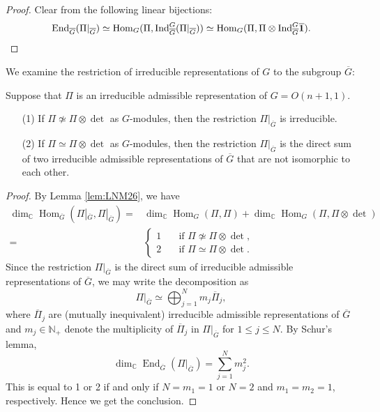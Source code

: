 \begin{proof}
Clear from the following linear bijections:
\[
{\operatorname{End}}_{\overline G}(\Pi|_{\overline{G}})
\simeq 
{\operatorname{Hom}}_{G}(\Pi, {\operatorname{Ind}}_{\overline G}^{G}(\Pi|_{\overline{G}}))
\simeq 
{\operatorname{Hom}}_{G}(\Pi, \Pi \otimes {\operatorname{Ind}}_{\overline G}^{G}\overline{\bf{1}}).  
\]
\end{proof}

We examine the restriction
 of irreducible representations of $G$
 to the subgroup $\overline G$:

\begin{lemma}
\label{lem:171523}
Suppose that $\Pi$ is an irreducible admissible representation of $G=O(n+1,1)$.  
\begin{enumerate}
\item[{\rm{(1)}}]
If $\Pi \not \simeq \Pi \otimes \det$ as $G$-modules, 
 then the restriction $\Pi|_{\overline G}$ is irreducible.  
\item[{\rm{(2)}}]
If $\Pi \simeq \Pi \otimes \det$ as $G$-modules, 
then the restriction $\Pi|_{\overline G}$ is the direct sum 
of two irreducible admissible representations
of $\overline G$ that are not isomorphic to each other.  
\end{enumerate}
\end{lemma}
\begin{proof}
By Lemma \ref{lem:LNM26}, 
 we have 
\begin{align*}
\dim_{\mathbb{C}}{\operatorname{Hom}}_{\overline G}(\Pi|_{\overline G}, \Pi|_{\overline G})
=& \dim_{\mathbb{C}} {\operatorname{Hom}}_{G}(\Pi, \Pi) 
+ \dim_{\mathbb{C}}{\operatorname{Hom}}_{G}(\Pi, \Pi \otimes \det)
\\
=& 
\begin{cases}
1 \quad &\text{if $\Pi \not \simeq \Pi \otimes \det$, }
\\
2 \quad &\text{if $\Pi \simeq \Pi \otimes \det$.  }
\end{cases}
\end{align*}
Since the restriction $\Pi|_{\overline G}$ is the direct sum
 of irreducible admissible representations 
 of ${\overline G}$, 
 we may write the decomposition as 
\[
  \Pi|_{\overline G} \simeq \bigoplus_{j=1}^{N} m_j \overline{\Pi}_j,
\]
where $\overline{\Pi}_j$ are 
 (mutually inequivalent)
 irreducible admissible representations of $\overline G$
 and $m_j \in {\mathbb{N}}_+$
 denote the multiplicity of $\overline{\Pi}_j$ in $\Pi|_{\overline G}$
 for $1 \le j \le N$.  
By Schur's lemma, 
\[
  \dim_{\mathbb{C}} {\operatorname{End}}_{\overline{G}}
  (\Pi|_{\overline G}) = \sum_{j=1}^N m_j^2.  
\]
This is equal to 1 or 2 
 if and only if $N=m_1 =1$ or $N=2$ and $m_1 = m_2=1$, 
respectively.  
Hence we get  the conclusion.  
\end{proof}



